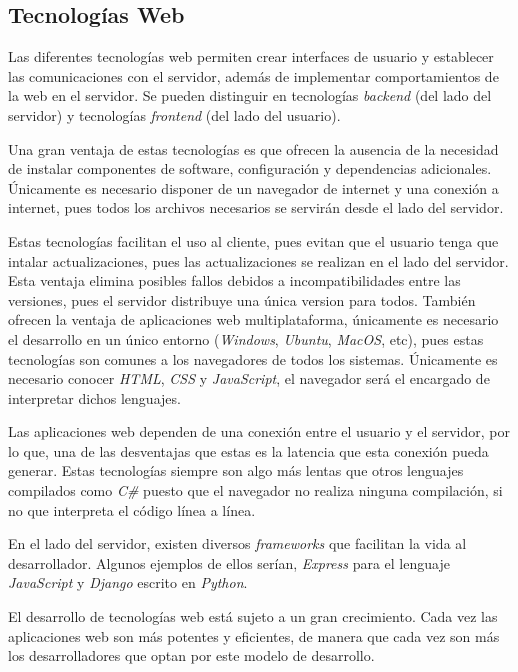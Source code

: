 \documentclass[a4paper, 12pt]{book}
\begin{document}
\subsection{Tecnologías Web}

Las diferentes tecnologías web permiten crear interfaces de usuario y establecer las comunicaciones con el servidor, además de implementar comportamientos de la web en el servidor. Se pueden distinguir en tecnologías \emph{backend} (del lado del servidor) y tecnologías \emph{frontend} (del lado del usuario).

Una gran ventaja de estas tecnologías es que ofrecen la ausencia de la necesidad de instalar componentes de software, configuración y dependencias adicionales. Únicamente es necesario disponer de un navegador de internet y una conexión a internet, pues todos los archivos necesarios se servirán desde el lado del servidor.

Estas tecnologías facilitan el uso al cliente, pues evitan que el usuario tenga que intalar actualizaciones, pues las actualizaciones se realizan en el lado del servidor. Esta ventaja elimina posibles fallos debidos a incompatibilidades entre las versiones, pues el servidor distribuye una única version para todos. También ofrecen la ventaja de aplicaciones web multiplataforma, únicamente es necesario el desarrollo en un único entorno (\emph{Windows}, \emph{Ubuntu}, \emph{MacOS}, etc), pues estas tecnologías son comunes a los navegadores de todos los sistemas. Únicamente es necesario conocer \emph{HTML}, \emph{CSS} y \emph{JavaScript}, el navegador será el encargado de interpretar dichos lenguajes.

Las aplicaciones web dependen de una conexión entre el usuario y el servidor, por lo que, una de las desventajas que estas es la latencia que esta conexión pueda generar. Estas tecnologías siempre son algo más lentas que otros lenguajes compilados como \emph{C\#} puesto que el navegador no realiza ninguna compilación, si no que interpreta el código línea a línea.

En el lado del servidor, existen diversos \emph{frameworks} que facilitan la vida al desarrollador. Algunos ejemplos de ellos serían, \emph{Express} para el lenguaje \emph{JavaScript} y \emph{Django} escrito en \emph{Python}.

El desarrollo de tecnologías web está sujeto a un gran crecimiento. Cada vez las aplicaciones web son más potentes y eficientes, de manera que cada vez son más los desarrolladores que optan por este modelo de desarrollo.
\end{document}
